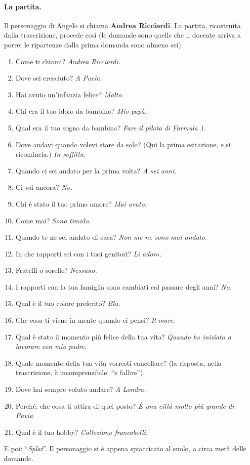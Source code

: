 \paragraph{La partita.} Il personaggio di Angelo si chiama \textbf{Andrea
Ricciardi}. La partita, ricostruita dalla trascrizione, procede così (le domande
sono quelle che il docente arriva a porre; le ripartenze dalla prima domanda sono
almeno sei):
\begin{enumerate}
  \item Come ti chiami? \emph{Andrea Ricciardi.}
  \item Dove sei cresciuto? \emph{A Pavia.}
  \item Hai avuto un'infanzia felice? \emph{Molto.}
  \item Chi era il tuo idolo da bambino? \emph{Mio papà.}
  \item Qual era il tuo sogno da bambino? \emph{Fare il pilota di Formula 1.}
  \item Dove andavi quando volevi stare da solo? (Qui la prima esitazione, e si
        ricomincia.) \emph{In soffitta.}
  \item Quando ci sei andato per la prima volta? \emph{A sei anni.}
  \item Ci vai ancora? \emph{No.}
  \item Chi è stato il tuo primo amore? \emph{Mai avuto.}
  \item Come mai? \emph{Sono timido.}
  \item Quando te ne sei andato di casa? \emph{Non me ne sono mai andato.}
  \item In che rapporti sei con i tuoi genitori? \emph{Li adoro.}
  \item Fratelli o sorelle? \emph{Nessuno.}
  \item I rapporti con la tua famiglia sono cambiati col passare degli anni?
        \emph{No.}
  \item Qual è il tuo colore preferito? \emph{Blu.}
  \item Che cosa ti viene in mente quando ci pensi? \emph{Il mare.}
  \item Qual è stato il momento più felice della tua vita? \emph{Quando ho
        iniziato a lavorare con mio padre.}
  \item Quale momento della tua vita vorresti cancellare? (la risposta, nella trascrizione, è
        incomprensibile: ``e fallire'').
  \item Dove hai sempre voluto andare? \emph{A Londra.}
  \item Perché, che cosa ti attira di quel posto? \emph{È una città molto più
        grande di Pavia.}
  \item Qual è il tuo hobby? \emph{Colleziono francobolli.}
\end{enumerate}
E poi: ``\emph{Splat}''. Il personaggio si è appena spiaccicato al suolo, a circa metà
delle domande.

